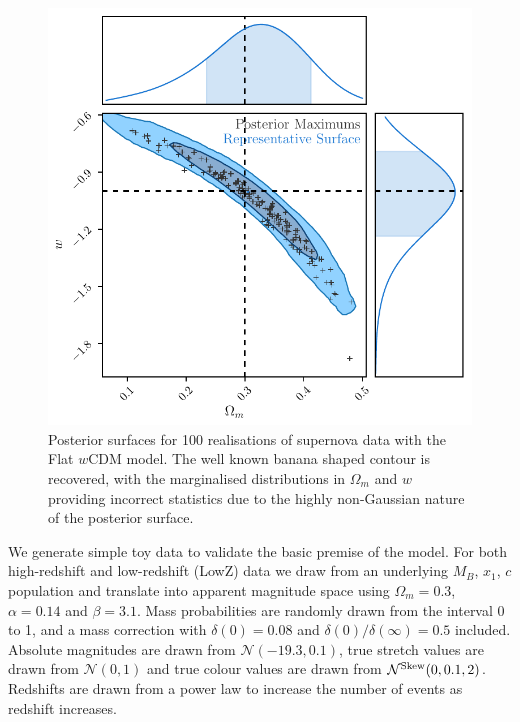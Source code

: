 \documentclass[a4paper,fleqn,usenatbib]{mnras}
\begin{document}
\begin{figure}
	\begin{center}
		\includegraphics[width=\columnwidth]{simpleApproximateModelW.pdf}
	\end{center}
	\caption{Posterior surfaces for 100 realisations of supernova data with the Flat $w$CDM model. The well known banana shaped contour is recovered, with the marginalised distributions in $\Omega_m$ and $w$ providing incorrect statistics due to the highly non-Gaussian nature of the posterior surface.}
	\label{fig:simple_w}
\end{figure}

We generate simple toy data to validate the basic premise of the model. For both high-redshift and low-redshift (LowZ) data we draw from an underlying $M_B$, $x_1$, $c$ population and translate into apparent magnitude space using $\Omega_m = 0.3$, $\alpha= 0.14$ and $\beta = 3.1$. Mass probabilities are randomly drawn from the interval 0 to 1, and a mass correction with $\delta(0) = 0.08$ and $\delta(0)/\delta(\infty) =0.5$ included. Absolute magnitudes are drawn from $\mathcal{N}(-19.3, 0.1)$, true stretch values are drawn from $\mathcal{N}(0, 1)$ and true colour values are drawn from $\mathcal{N}^{\rm Skew}(0, 0.1, 2)$. Redshifts are drawn from a power law to increase the number of events as redshift increases. 
\end{document}
